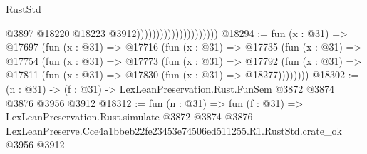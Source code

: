 \begin{lexlean}{RustStd}
\begin{coremodule}
                                              @3897
                                              @18220
                                              @18223
                                              @3912)))))))))))))))))))))
@18294 := fun (x : @31) =>
  @17697
    (fun (x : @31) =>
    @17716
      (fun (x : @31) =>
      @17735
        (fun (x : @31) =>
        @17754
          (fun (x : @31) =>
          @17773
            (fun (x : @31) =>
            @17792
              (fun (x : @31) => @17811 (fun (x : @31) => @17830 (fun (x : @31) => @18277))))))))
@18302 := (n : @31) -> (f : @31) -> LexLeanPreservation.Rust.FunSem @3872 @3874 @3876 @3956 @3912
@18312 := fun (n : @31) =>
  fun (f : @31) =>
  LexLeanPreservation.Rust.simulate
    @3872
    @3874
    @3876
    LexLeanPreserve.Cce4a1bbeb22fe23453e74506ed511255.R1.RustStd.crate_ok
    @3956
    @3912
\end{coremodule}
\end{lexlean}
